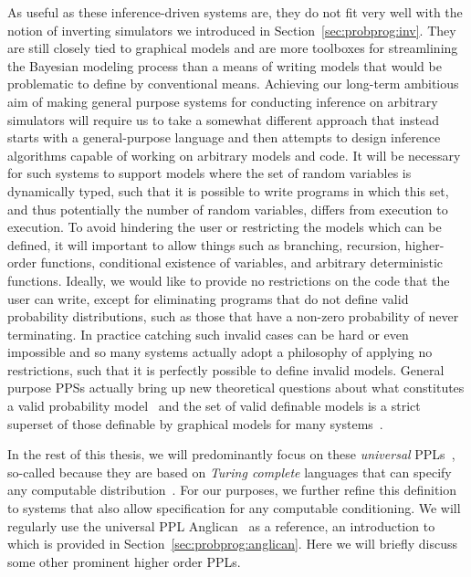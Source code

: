 As useful as these inference-driven systems are, they do not fit very well with the notion of
inverting simulators we introduced in Section~\ref{sec:probprog:inv}.  They are still closely tied
to graphical models and are more toolboxes for streamlining the Bayesian modeling process than
a means of writing models that would be problematic to define by conventional means.  Achieving
our long-term ambitious aim of making general purpose systems for conducting inference on
arbitrary simulators will require us to take a somewhat different approach that instead starts
with a general-purpose language and then attempts to design inference algorithms capable of
working on arbitrary models and code.  It will be necessary for such systems to
support models where the set of random variables is dynamically typed, such that it is possible 
to write programs in which this set, and thus potentially the number of random variables, differs 
from execution to execution.  To avoid hindering the user or restricting the models which can be
defined, it will important to allow 
things such as branching, recursion, higher-order functions,
conditional existence of variables, and arbitrary
deterministic functions.  Ideally, we would like to provide no restrictions on the code that the user
can write, except for eliminating programs that do not define valid probability distributions, such as
those that have a non-zero probability of never terminating.  In practice catching such invalid cases can
be hard or even impossible and so many systems actually adopt a philosophy of applying no restrictions,
such that it is perfectly possible to define invalid models.  General purpose PPSs actually bring up new
theoretical questions about what constitutes a valid probability model~\citep{heunen2017convenient} and
the set of valid definable models is a strict superset of those definable by graphical models 
for many systems~\citep{goodman2013principles}.

In the rest of this thesis, we will predominantly focus on these \emph{universal} PPLs~\citep{goodman_uai_2008,staton2016semantics}, 
so-called because they are based on \emph{Turing complete} languages that can specify any
computable distribution~\citep{goodman2013principles}.  For our purposes, we further refine this definition
to systems that also allow specification for any computable conditioning.
We will regularly use the universal PPL Anglican~\citep{wood2014new} as a reference, an introduction
to which is provided in Section~\ref{sec:probprog:anglican}. Here we will briefly discuss some other
prominent higher order PPLs.

